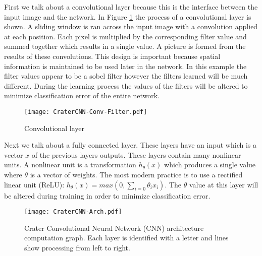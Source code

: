 \documentclass[twoside]{article}
\begin{document}
First we talk about a convolutional layer because this is the interface between the input image and the network. In Figure \ref{fig:convlayer} the process of a convolutional layer is shown. A sliding window is ran across the input image with a convolution applied at each position. Each pixel is multiplied by the corresponding filter value and summed together which results in a single value. A picture is formed from the results of these convolutions. This design is important because  spatial information is maintained to be used later in the network. In this example the filter values appear to be a sobel filter however the filters learned will be much different. During the learning process the values of the filters will be altered to minimize classification error of the entire network.

\begin{figure}[h]
\begin{center}
\vspace{-10pt}
  \texttt{[image: CraterCNN-Conv-Filter.pdf]}
  \caption[labelInTOC]{Convolutional layer}
  \label{fig:convlayer}
\end{center}
\vspace{-20pt}
\end{figure}

Next we talk about a fully connected layer. These layers have an input which is a vector $x$ of the previous layers outputs. These layers contain many nonlinear units. A nonlinear unit is a transformation $h_\theta(x)$ which produces a single value where $\theta$ is a vector of weights. The most modern practice is to use a rectified linear unit (ReLU): $h_\theta(x)=max(0,\sum_{i=0}\theta_i x_i)$. The $\theta$ value at this layer will be altered during training in order to minimize classification error.


\begin{figure}[h]
\begin{center}
\vspace{-10pt}
  \texttt{[image: CraterCNN-Arch.pdf]}
  \vspace{-20pt}
  \caption[labelInTOC]{Crater Convolutional Neural Network (CNN) architecture computation graph. Each layer is identified with a letter and lines show processing from left to right.}
  \label{fig:cnnarch}
\end{center}
\vspace{-20pt}
\end{figure}
\end{document}
